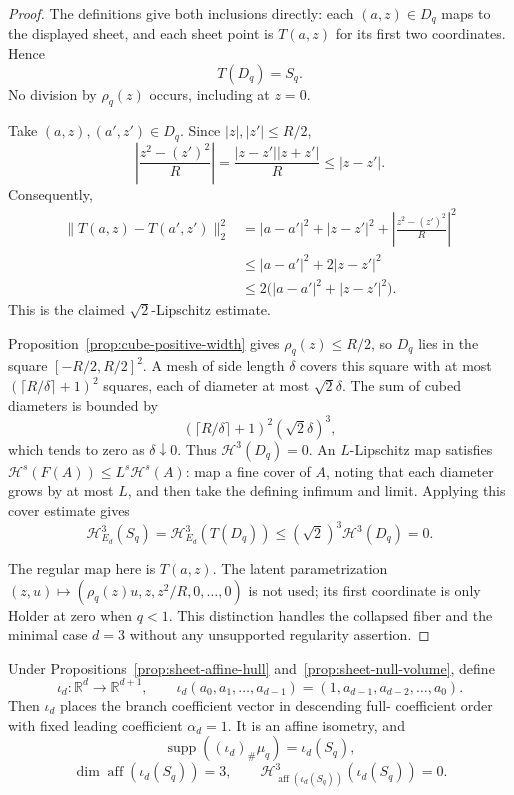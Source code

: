 \begin{proof}
The definitions give both inclusions directly: each $(a,z)\in D_q$ maps
to the displayed sheet, and each sheet point is $T(a,z)$ for its first
two coordinates.  Hence
\[
T(D_q)=S_q.
\]
No division by $\rho_q(z)$ occurs, including at $z=0$.

Take $(a,z),(a',z')\in D_q$.  Since
$|z|,|z'|\leq R/2$,
\[
\left|\frac{z^2-(z')^2}{R}\right|
=\frac{|z-z'||z+z'|}{R}
\leq|z-z'|.
\]
Consequently,
\[
\begin{aligned}
\|T(a,z)-T(a',z')\|_2^2
&=|a-a'|^2+|z-z'|^2
 +\left|\frac{z^2-(z')^2}{R}\right|^2\\
&\leq|a-a'|^2+2|z-z'|^2\\
&\leq2\bigl(|a-a'|^2+|z-z'|^2\bigr).
\end{aligned}
\]
This is the claimed $\sqrt2$-Lipschitz estimate.

Proposition~\ref{prop:cube-positive-width} gives
$\rho_q(z)\leq R/2$, so $D_q$ lies in the square
$[-R/2,R/2]^2$.  A mesh of side length $\delta$ covers this square with
at most $(\lceil R/\delta\rceil+1)^2$ squares, each of diameter at most
$\sqrt2\delta$.  The sum of cubed diameters is bounded by
\[
(\lceil R/\delta\rceil+1)^2(\sqrt2\delta)^3,
\]
which tends to zero as $\delta\downarrow0$.  Thus
$\mathcal H^3(D_q)=0$.  An $L$-Lipschitz map satisfies
$\mathcal H^s(F(A))\leq L^s\mathcal H^s(A)$: map a fine cover of $A$,
noting that each diameter grows by at most $L$, and then take the
defining infimum and limit.  Applying this cover estimate gives
\[
\mathcal H^3_{E_d}(S_q)
=\mathcal H^3_{E_d}(T(D_q))
\leq(\sqrt2)^3\mathcal H^3(D_q)=0.
\]

The regular map here is $T(a,z)$.  The latent parametrization
$(z,u)\mapsto(\rho_q(z)u,z,z^2/R,0,\ldots,0)$ is not used; its first
coordinate is only Holder at zero when $q<1$.  This distinction handles
the collapsed fiber and the minimal case $d=3$ without any unsupported
regularity assertion.
\end{proof}

\begin{lemma}
\label{lem:monic-embedding}
Under Propositions~\ref{prop:sheet-affine-hull}
and~\ref{prop:sheet-null-volume}, define
\[
\iota_d:\mathbb R^d\longrightarrow\mathbb R^{d+1},
\qquad
\iota_d(a_0,a_1,\ldots,a_{d-1})
=(1,a_{d-1},a_{d-2},\ldots,a_0).
\]
Then $\iota_d$ places the branch coefficient vector in descending full-
coefficient order with fixed leading coefficient $\alpha_d=1$.  It is an
affine isometry, and
\[
\operatorname{supp}((\iota_d)_\#\mu_q)=\iota_d(S_q),
\]
\[
\dim\operatorname{aff}(\iota_d(S_q))=3,
\qquad
\mathcal H^3_{\operatorname{aff}(\iota_d(S_q))}
  (\iota_d(S_q))=0.
\]
\end{lemma}


